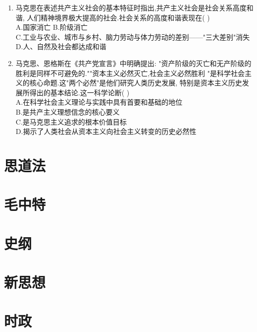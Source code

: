 \documentclass[12pt, a4paper, oneside, UTF8]{ctexbook}
\begin{document}
\begin{enumerate}
    \item 马克思在表述共产主义社会的基本特征时指出,共产主义社会是社会关系高度和谐,
    人们精神境界极大提高的社会.社会关系的高度和谐表现在(   ) \\
    A.国家消亡\qquad
    B.阶级消亡 \\
    C.工业与农业、城市与乡村、脑力劳动与体力劳动的差别——"三大差别"消失 \\
    D.人、自然及社会都达成和谐 

    \item 马克思、恩格斯在《共产党宣言》中明确提出:
    "资产阶级的灭亡和无产阶级的胜利是同样不可避免的.""资本主义必然灭亡,社会主义必然胜利
    "是科学社会主义的核心命题.这"两个必然"是他们研究人类历史发展,
    特别是资本主义历史发展所得出的基本结论.这一科学论断(   ) \\
    A.在科学社会主义理论与实践中具有首要和基础的地位 \\
    B.是共产主义理想信念的核心要义\\
    C.是马克思主义追求的根本价值目标\\
    D.揭示了人类社会从资本主义向社会主义转变的历史必然性
\end{enumerate}
\section{思道法} 

\section{毛中特} 

\section{史纲}

\section{新思想}

\section{时政}

\ifx\allfiles\undefined
\end{document}
